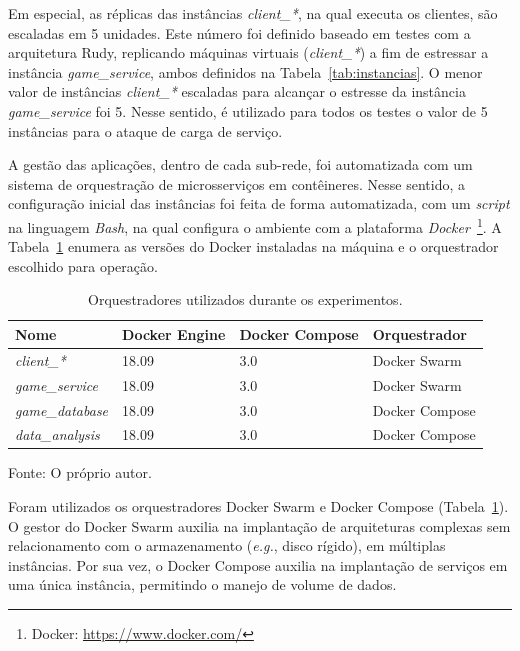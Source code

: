 Em especial, as réplicas das instâncias \textit{client\_*}, na qual executa os clientes, são escaladas em 5 unidades.
%
Este número foi definido baseado em testes com a arquitetura Rudy, replicando máquinas virtuais (\textit{client\_*}) a fim de estressar a instância \textit{game\_service}, ambos definidos na Tabela~\ref{tab:instancias}.
%
O menor valor de instâncias \textit{client\_*} escaladas para alcançar o estresse da instância \textit{game\_service} foi 5.
%
Nesse sentido, é utilizado para todos os testes o valor de 5 instâncias para o ataque de carga de serviço.


A gestão das aplicações, dentro de cada sub-rede, foi automatizada com um sistema de orquestração de microsserviços em contêineres.
%
Nesse sentido, a configuração inicial das instâncias foi feita de forma automatizada, com um \textit{script} na linguagem \textit{Bash}, na qual configura o ambiente com a plataforma \textit{Docker}~\footnote{Docker: \url{https://www.docker.com/}}.
%
A Tabela~\ref{tab:docker_versoes} enumera as versões do Docker instaladas na máquina e o orquestrador escolhido para operação.

\begin{table}[htb!]
    \centering
    \caption{Orquestradores utilizados durante os experimentos.}
    \label{tab:docker_versoes}
    \begin{tabular}{|l|l|l|l|}
    \hline
        Nome                    & Docker Engine & Docker Compose & Orquestrador   \\ \hline
        \textit{client\_*}      & 18.09         & 3.0            & Docker Swarm   \\ \hline
        \textit{game\_service}  & 18.09         & 3.0            & Docker Swarm   \\ \hline
        \textit{game\_database} & 18.09         & 3.0            & Docker Compose \\ \hline
        \textit{data\_analysis} & 18.09         & 3.0            & Docker Compose \\ \hline
    \end{tabular}

    Fonte: O próprio autor.
\end{table}

Foram utilizados os orquestradores Docker Swarm e Docker Compose (Tabela~\ref{tab:docker_versoes}).
%
O gestor do Docker Swarm auxilia na implantação de arquiteturas complexas sem relacionamento com o armazenamento (\textit{e.g.}, disco rígido), em múltiplas instâncias.
%
Por sua vez, o Docker Compose auxilia na implantação de serviços em uma única instância, permitindo o manejo de volume de dados.

